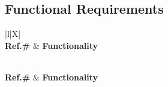 \subsection{Functional Requirements}
\begin{xltabular}{\linewidth}{|l|X|}
	\hline {} \\ \hline {} \textbf{Ref.\#} & \textbf{Functionality} \\ \hline
	\endfirsthead
	
	\hline {} \\ \hline {} \textbf{Ref.\#} & \textbf{Functionality} \\ \hline
	\endhead
	
	\hline {} \\ \hline
	\endfoot
	
	\hline \caption{Requirements} \label{Tab:Requirements}
	\endlastfoot
	

\end{xltabular}
